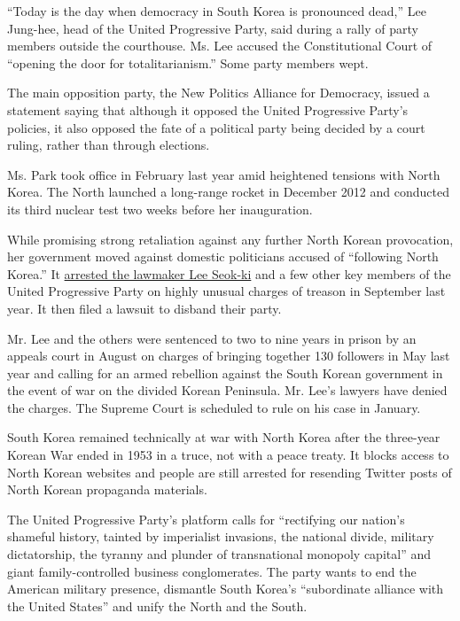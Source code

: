 ``Today is the day when democracy in South Korea is pronounced dead,''
Lee Jung-hee, head of the United Progressive Party, said during a rally
of party members outside the courthouse. Ms. Lee accused the
Constitutional Court of ``opening the door for totalitarianism.'' Some
party members wept.

The main opposition party, the New Politics Alliance for Democracy,
issued a statement saying that although it opposed the United
Progressive Party's policies, it also opposed the fate of a political
party being decided by a court ruling, rather than through elections.

Ms. Park took office in February last year amid heightened tensions with
North Korea. The North launched a long-range rocket in December 2012 and
conducted its third nuclear test two weeks before her inauguration.

While promising strong retaliation against any further North Korean
provocation, her government moved against domestic politicians accused
of ``following North Korea.'' It
\href{http://www.nytimes.com/2013/09/05/world/asia/south-korean-lawmakers-back-arrest-of-colleague-for-treason.html}{arrested
the lawmaker Lee Seok-ki} and a few other key members of the United
Progressive Party on highly unusual charges of treason in September last
year. It then filed a lawsuit to disband their party.

Mr. Lee and the others were sentenced to two to nine years in prison by
an appeals court in August on charges of bringing together 130 followers
in May last year and calling for an armed rebellion against the South
Korean government in the event of war on the divided Korean Peninsula.
Mr. Lee's lawyers have denied the charges. The Supreme Court is
scheduled to rule on his case in January.

South Korea remained technically at war with North Korea after the
three-year Korean War ended in 1953 in a truce, not with a peace treaty.
It blocks access to North Korean websites and people are still arrested
for resending Twitter posts of North Korean propaganda materials.

The United Progressive Party's platform calls for ``rectifying our
nation's shameful history, tainted by imperialist invasions, the
national divide, military dictatorship, the tyranny and plunder of
transnational monopoly capital'' and giant family-controlled business
conglomerates. The party wants to end the American military presence,
dismantle South Korea's ``subordinate alliance with the United States''
and unify the North and the South.

